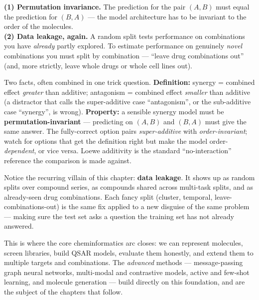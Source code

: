 \documentclass[11pt, oneside]{book}
\begin{document}
\begin{notebox}[title={Two traps specific to synergy models}]
\textbf{(1) Permutation invariance.} The prediction for the pair $(A,B)$ must equal
the prediction for $(B,A)$ --- the model architecture has to be invariant to the
order of the molecules.\\[2pt]
\textbf{(2) Data leakage, again.} A random split tests performance on combinations
you have \emph{already} partly explored. To estimate performance on genuinely
\emph{novel} combinations you must split by combination --- ``leave drug
combinations out'' (and, more strictly, leave whole drugs or whole cell lines out).
\end{notebox}

\begin{starbox}[title={Exam-critical: synergy vs.\ antagonism, plus symmetry}]
Two facts, often combined in one trick question. \textbf{Definition:} synergy =
combined effect \emph{greater} than additive; antagonism = combined effect
\emph{smaller} than additive (a distractor that calls the super-additive case
``antagonism'', or the sub-additive case ``synergy'', is wrong). \textbf{Property:}
a sensible synergy model must be \textbf{permutation-invariant} --- predicting on
$(A,B)$ and $(B,A)$ must give the same answer. The fully-correct option pairs
\emph{super-additive} with \emph{order-invariant}; watch for options that get the
definition right but make the model order-\emph{dependent}, or vice versa. Loewe
additivity is the standard ``no-interaction'' reference the comparison is made
against.
\end{starbox}

\begin{intbox}
Notice the recurring villain of this chapter: \textbf{data leakage}. It shows up as
random splits over compound series, as compounds shared across multi-task splits,
and as already-seen drug combinations. Each fancy split (cluster, temporal,
leave-combinations-out) is the same fix applied to a new disguise of the same
problem --- making sure the test set asks a question the training set has not
already answered.
\end{intbox}

This is where the core cheminformatics arc closes: we can represent molecules,
screen libraries, build QSAR models, evaluate them honestly, and extend them to
multiple targets and combinations. The \emph{advanced} methods --- message-passing
graph neural networks, multi-modal and contrastive models, active and few-shot
learning, and molecule generation --- build directly on this foundation, and are
the subject of the chapters that follow.
\end{document}
